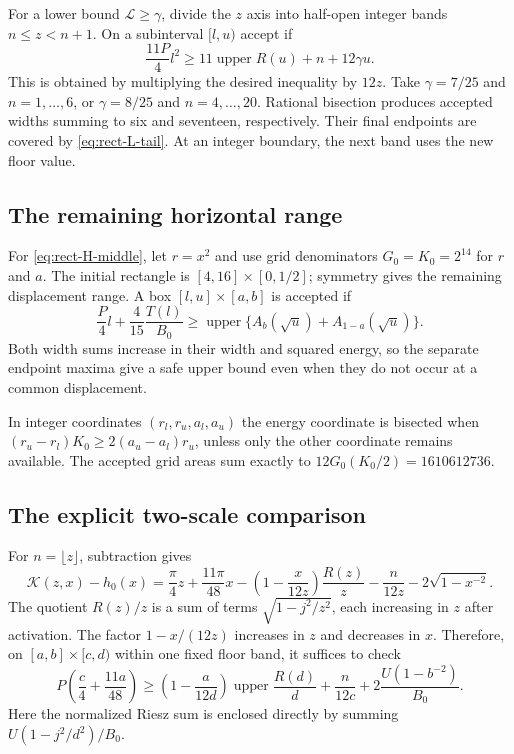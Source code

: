 \documentclass[11pt,reqno]{amsart}
\numberwithin{equation}{section}
\begin{document}
For a lower bound $\mathcal L\ge\gamma$, divide the $z$
axis into half-open integer bands $n\le z<n+1$. On a
subinterval $[l,u)$ accept if
\begin{equation}\label{eq:rect-L-box}
 \frac{11P}{4}l^2
 \ge11\operatorname{upper}R(u)+n+12\gamma u.
\end{equation}
This is obtained by multiplying the desired inequality by
$12z$. Take $\gamma=7/25$ and $n=1,\ldots,6$, or
$\gamma=8/25$ and $n=4,\ldots,20$. Rational bisection
produces accepted widths summing to six and seventeen,
respectively. Their final endpoints are covered by
\eqref{eq:rect-L-tail}. At an integer boundary, the next
band uses the new floor value.

\subsection*{The remaining horizontal range}

For \eqref{eq:rect-H-middle}, let $r=x^2$ and use grid
denominators $G_0=K_0=2^{14}$ for $r$ and $a$. The initial
rectangle is $[4,16]\times[0,1/2]$; symmetry gives the
remaining displacement range. A box $[l,u]\times[a,b]$ is
accepted if
\begin{equation}\label{eq:rect-H-box}
 \frac P4l+\frac4{15}\frac{T(l)}{B_0}
 \ge\operatorname{upper}
       \{A_b(\sqrt u)+A_{1-a}(\sqrt u)\}.
\end{equation}
Both width sums increase in their width and squared energy,
so the separate endpoint maxima give a safe upper bound even
when they do not occur at a common displacement.

In integer coordinates $(r_l,r_u,a_l,a_u)$ the energy
coordinate is bisected when
$(r_u-r_l)K_0\ge2(a_u-a_l)r_u$, unless only the other
coordinate remains available. The accepted grid areas sum
exactly to $12G_0(K_0/2)=1610612736$.

\subsection*{The explicit two-scale comparison}

For $n=\lfloor z\rfloor$, subtraction gives
\begin{equation}\label{eq:rect-center-expanded}
 \mathcal K(z,x)-h_0(x)
 =\frac\pi4z+\frac{11\pi}{48}x
 -\left(1-\frac{x}{12z}\right)\frac{R(z)}z
 -\frac n{12z}-2\sqrt{1-x^{-2}}.
\end{equation}
The quotient $R(z)/z$ is a sum of terms
$\sqrt{1-j^2/z^2}$, each increasing in $z$ after activation.
The factor $1-x/(12z)$ increases in $z$ and decreases in $x$.
Therefore, on $[a,b]\times[c,d)$ within one fixed floor
band, it suffices to check
\begin{equation}\label{eq:rect-center-box}
 P\left(\frac c4+\frac{11a}{48}\right)
 \ge\left(1-\frac a{12d}\right)
       \operatorname{upper}\frac{R(d)}d
       +\frac n{12c}
       +2\frac{U(1-b^{-2})}{B_0}.
\end{equation}
Here the normalized Riesz sum is enclosed directly by summing
$U(1-j^2/d^2)/B_0$.
\end{document}
